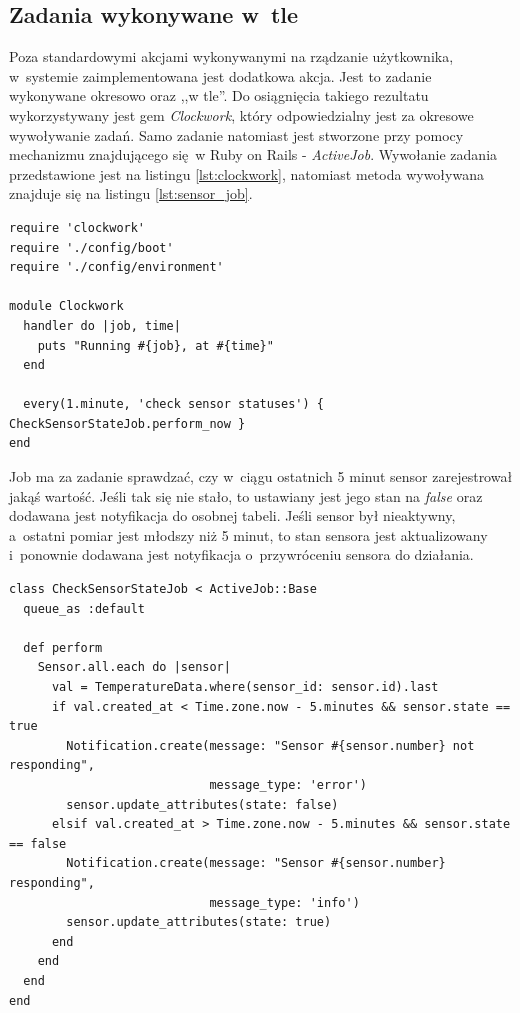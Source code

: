 \documentclass[eng,oneside]{mgr}
\begin{document}
\subsection{Zadania wykonywane w~tle} %
\label{sub:zadania_wykonywane_w_tle}
Poza standardowymi akcjami wykonywanymi na rządzanie użytkownika, w~systemie zaimplementowana jest dodatkowa akcja. Jest to zadanie wykonywane okresowo oraz ,,w tle''. Do osiągnięcia takiego rezultatu wykorzystywany jest gem \emph{Clockwork}, który odpowiedzialny jest za okresowe wywoływanie zadań. Samo zadanie natomiast jest stworzone przy pomocy mechanizmu znajdującego się w Ruby on Rails - \emph{ActiveJob}. Wywołanie zadania przedstawione jest na listingu \ref{lst:clockwork}, natomiast metoda wywoływana znajduje się na listingu \ref{lst:sensor_job}.
\begin{lstlisting}[caption={Konfiguracja gemu Clockwork.},label=lst:clockwork]
require 'clockwork'
require './config/boot'
require './config/environment'

module Clockwork
  handler do |job, time|
    puts "Running #{job}, at #{time}"
  end

  every(1.minute, 'check sensor statuses') { CheckSensorStateJob.perform_now }
end
\end{lstlisting}

Job ma za zadanie sprawdzać, czy w~ciągu ostatnich 5 minut sensor zarejestrował jakąś wartość. Jeśli tak się nie stało, to ustawiany jest jego stan na \emph{false} oraz dodawana jest notyfikacja do osobnej tabeli. Jeśli sensor był nieaktywny, a~ostatni pomiar jest młodszy niż 5 minut, to stan sensora jest aktualizowany i~ponownie dodawana jest notyfikacja o~przywróceniu sensora do działania.

\begin{lstlisting}[caption={Job uaktualniający stan sensora.},label=lst:sensor_job]
class CheckSensorStateJob < ActiveJob::Base
  queue_as :default

  def perform
    Sensor.all.each do |sensor|
      val = TemperatureData.where(sensor_id: sensor.id).last
      if val.created_at < Time.zone.now - 5.minutes && sensor.state == true
        Notification.create(message: "Sensor #{sensor.number} not responding",
                            message_type: 'error')
        sensor.update_attributes(state: false)
      elsif val.created_at > Time.zone.now - 5.minutes && sensor.state == false
        Notification.create(message: "Sensor #{sensor.number} responding",
                            message_type: 'info')
        sensor.update_attributes(state: true)
      end
    end
  end
end
\end{lstlisting}
\end{document}
